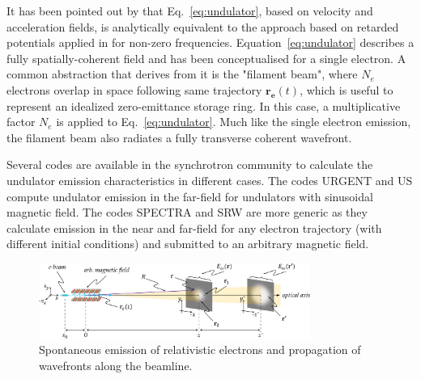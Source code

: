 \documentclass{iucr}              %
\begin{document}
It has been pointed out by  that Eq.~\ref{eq:undulator}, based on velocity and acceleration fields, is analytically equivalent to the approach based on retarded potentials applied in \cite{Chubar1995} for non-zero frequencies. Equation~\ref{eq:undulator} describes a fully spatially-coherent field and has been conceptualised for a single electron. A common abstraction that derives from it is the "filament beam", where $N_e$ electrons overlap in space following same trajectory $\textbf{r}_{\textbf{e}}(t)$, which is useful to  represent an idealized zero-emittance storage ring. In this case, a multiplicative factor $N_e$ is applied to Eq.~\ref{eq:undulator}. Much like the single electron emission, the filament beam also radiates a fully transverse coherent wavefront.



Several codes are available in the synchrotron community to calculate the undulator emission characteristics in different cases. The codes URGENT \cite{codeURGENT} and US \cite{codeUS} compute undulator emission in the far-field for undulators with sinusoidal magnetic field. The codes SPECTRA \cite{Tanaka2001} and SRW \cite{codeSRW} are more generic as they calculate emission in the near and far-field for any electron trajectory (with different initial conditions) and submitted to an arbitrary magnetic field.

\onecolumn
\begin{figure}\label{fig:coordinates}
    \centering
    \includegraphics[width=0.79\textwidth]{coordinates.pdf}
    \caption{Spontaneous emission of relativistic electrons and propagation of wavefronts along the beamline.}
\end{figure}
\twocolumn
\end{document}
